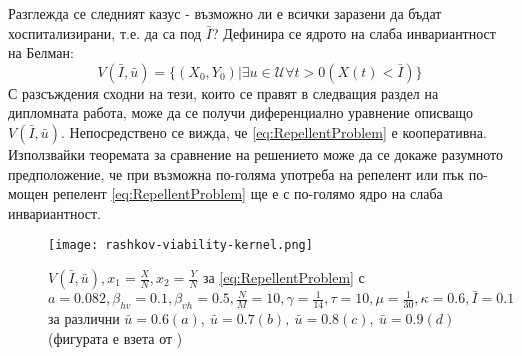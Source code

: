 Разглежда се следният казус - възможно ли е всички заразени да бъдат хоспитализирани, т.е. да са под $\bar{I}$?
Дефинира се ядрото на слаба инвариантност на Белман:
\begin{equation}
  \label{eq:BasicViability}
  V(\bar{I}, \bar{u}) = \{(X_0, Y_0) \vert \exists{u \in \mathscr{U}}\forall t>0 (X(t) < \bar{I})\}
\end{equation}
С разсъждения сходни на тези, които се правят в следващия раздел на дипломната работа, може да се получи диференциално уравнение описващо $V(\bar{I}, \bar{u})$.
Непосредствено се вижда, че \eqref{eq:RepellentProblem} е кооперативна.
Използвайки теоремата за сравнение на решението може да се докаже разумното предположение, че при възможна по-голяма употреба на репелент или пък по-мощен репелент \eqref{eq:RepellentProblem} ще е с по-голямо ядро на слаба инвариантност.

\begin{figure}[ht]
  \centering
  \texttt{[image: rashkov-viability-kernel.png]}
  \caption{$V(\bar{I}, \bar{u}), x_1 = \frac{X}{N}, x_2 = \frac{Y}{N}$ за \eqref{eq:RepellentProblem} с $a=0.082, \beta_{hv}=0.1, \beta_{vh}=0.5, \frac{N}{M} = 10, \gamma = \frac{1}{14}, \tau = 10, \mu=\frac{1}{30}, \kappa=0.6, \bar{I}=0.1$ за различни $\bar{u}=0.6 (a),~ \bar{u}=0.7 (b),~ \bar{u}=0.8 (c),~ \bar{u}=0.9 (d)$ (фигурата е взета от \cite{Rashkov2022})}
  \label{fig:RashkovResults}
\end{figure}
